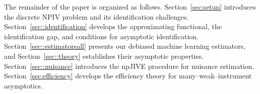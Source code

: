 \documentclass[11pt]{article}
\theoremstyle{plain}
\theoremstyle{definition}
\theoremstyle{remark}
\theoremstyle{definition}
\begin{document}




  \medskip

 
The remainder of the paper is organized as follows.
Section~\ref{sec:setup} introduces the discrete NPIV problem and its identification challenges.
Section~\ref{sec::identification} develops the approximating functional, the identification gap, and conditions for asymptotic identification.
Section~\ref{sec::estimatorsall} presents our debiased machine learning estimators, and Section~\ref{sec::theory} establishes their asymptotic properties.
Section~\ref{sec::nuisance} introduces the npJIVE procedure for nuisance estimation.
Section~\ref{sec:efficiency} develops the efficiency theory for many--weak--instrument asymptotics.
\end{document}
